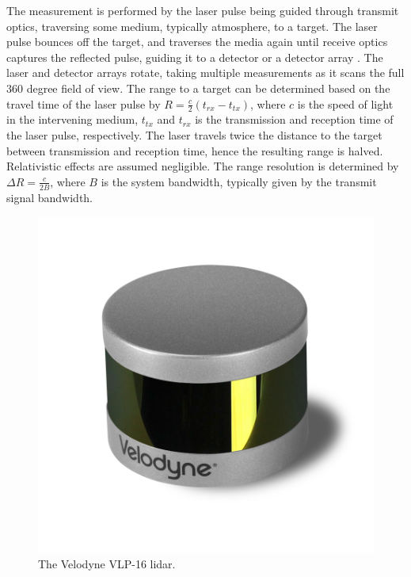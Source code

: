 The measurement is performed by the laser pulse being guided through transmit optics, traversing some medium, typically atmosphere, to a target. The laser pulse bounces off the target, and traverses the media again until receive optics captures the reflected pulse, guiding it to a detector or a detector array \cite{SpieLidar}. The laser and detector arrays rotate, taking multiple measurements as it scans the full 360 degree field of view. The range to a target can be determined based on the travel time of the laser pulse by $R=\frac{c}{2}(t_{rx}-t_{tx})$, where $c$ is the speed of light in the intervening medium, $t_{tx}$ and $t_{rx}$ is the transmission and reception time of the laser pulse, respectively. The laser travels twice the distance to the target between transmission and reception time, hence the resulting range is halved. Relativistic effects are assumed negligible. The range resolution is determined by $\Delta R=\frac{c}{2B}$, where $B$ is the system bandwidth, typically given by the transmit signal bandwidth.
\begin{figure}[H]
    \centering
    \includegraphics[width=.7\linewidth]{fig/Velodyne_LiDAR_Puck_VLP-16_Left_900.png}
    \caption{The Velodyne VLP-16 lidar.}
    \label{fig:vlp_16}
\end{figure}

